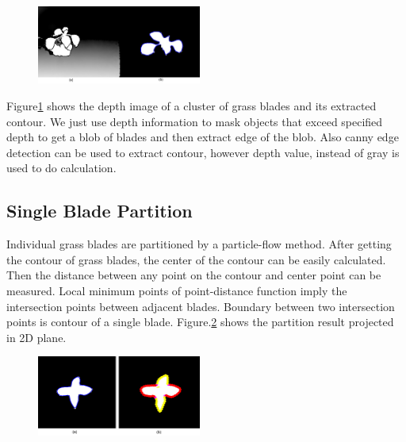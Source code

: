 \documentclass[10pt,journal,compsoc]{IEEEtran}
\begin{document}
\begin{figure}
    \centering
    \includegraphics[width=0.48\textwidth]{figs/depth_contour.jpg}
    \label{fig:depthimage}
\end{figure}

Figure\ref{fig:depthimage} shows the depth image of a cluster of grass blades and its extracted contour. We just use depth information to mask objects that exceed specified depth to get a blob of blades and then extract edge of the blob. Also canny edge detection can be used to extract contour, however depth value, instead of gray is used to do calculation.

\subsection{Single Blade Partition}

Individual grass blades are partitioned by a particle-flow method\cite{neubert2007approximate}. After getting the contour of grass blades, the center of the contour can be easily calculated. Then the distance between any point on the contour and center point can be measured. Local minimum points of point-distance function imply the intersection points between adjacent blades. Boundary between two intersection points is contour of a single blade. Figure.\ref{fig:partition} shows the partition result projected in 2D plane.

\begin{figure}
    \centering
    \includegraphics[width=0.48\textwidth]{figs/contour_partition.jpg}
    \label{fig:partition}
\end{figure}
\end{document}
